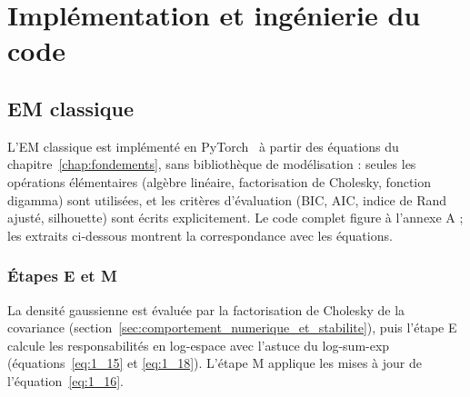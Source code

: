 \section{Implémentation et ingénierie du code}\label{sec:implementation}
\subsection{EM classique}\label{sec:impl_em}
L'EM classique est implémenté en PyTorch~\cite{paszke2019} à partir des équations du chapitre~\ref{chap:fondements}, sans bibliothèque de modélisation : seules les opérations élémentaires (algèbre linéaire, factorisation de Cholesky, fonction digamma) sont utilisées, et les critères d'évaluation (BIC, AIC, indice de Rand ajusté, silhouette) sont écrits explicitement. Le code complet figure à l'annexe A ; les extraits ci-dessous montrent la correspondance avec les équations.

\subsubsection*{Étapes E et M}
La densité gaussienne est évaluée par la factorisation de Cholesky de la covariance (section~\ref{sec:comportement_numerique_et_stabilite}), puis l'étape E calcule les responsabilités en log-espace avec l'astuce du log-sum-exp (équations~\ref{eq:1_15} et \ref{eq:1_18}). L'étape M applique les mises à jour de l'équation~\eqref{eq:1_16}.

